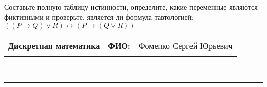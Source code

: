 \documentclass[10pt]{exam}
\newcommand{\class}{Дискретная математика}
\newcommand{\examdate}{}
\begin{document}
\begin{questions}
\begin{enumerate}[a)]
\end{enumerate}\question Составьте полную таблицу истинности, определите, какие переменные являются фиктивными и проверьте, является ли формула тавтологией:
$((P \rightarrow Q) \lor R) \leftrightarrow (P \rightarrow (Q \lor R))$

\end{questions}
\newpage
\begin{flushright}
\begin{tabular}{p{2.8in} r l}
\textbf{\class} & \textbf{ФИО:} &Фоменко Сергей Юрьевич
\\

\textbf{\examdate} &&\\
\end{tabular}\\
\end{flushright}
\rule[1ex]{\textwidth}{.1pt}
\end{document}
